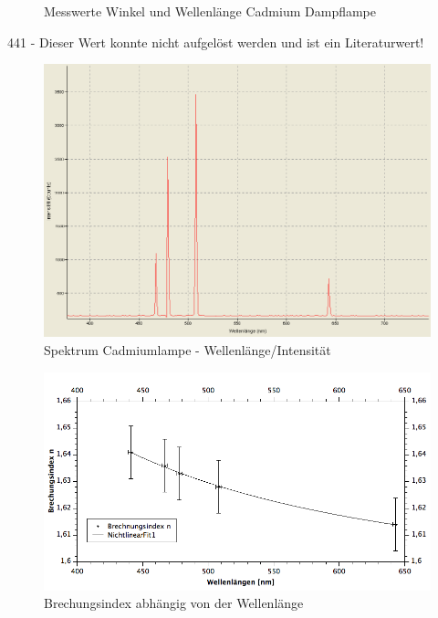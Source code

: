 \documentclass[12pt,a4paper]{article}
\begin{document}
\begin{multicols}{2}
\begin{figure}[H]
{			}
	\caption{Messwerte Winkel und Wellenlänge Cadmium Dampflampe}
	\label{fig:werte_cadmiumdampflampe}
\end{figure}
441 - Dieser Wert konnte nicht aufgelöst werden und ist ein Literaturwert!



\end{multicols}
\begin{figure}[H]
	\centering
	\includegraphics[scale=0.45]{./figure/Spektrum_Cadmiumdampflampe_PW7_Braun_Kurz.png}
	\caption{Spektrum Cadmiumlampe - Wellenlänge/Intensität}
	\label{fig:prisma_wellenlaenge}
\end{figure}

\begin{figure}[H]
	\centering
	\includegraphics[scale=0.5]{./figure/anfpra7_spektrum_grafik.png}
	\caption{Brechungsindex abhängig von der Wellenlänge}
	\label{fig:wellenlaenge_brechungsindex}
\end{figure}
\end{document}
